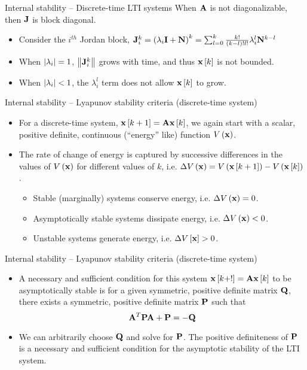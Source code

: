 \documentclass[aspectratio=169]{beamer}
\def\mf{\ensuremath\mathbf}
\def\lp{\ensuremath\left(}
\def\rp{\ensuremath\right)}
\def\lv{\ensuremath\left\lvert}
\def\rv{\ensuremath\right\rvert}
\def\lV{\ensuremath\left\lVert}
\def\rV{\ensuremath\right\rVert}
\def\ls{\ensuremath\left[}
\def\rs{\ensuremath\right]}
\newcommand{\ct}[1]{\lp #1\rp}
\newcommand{\dt}[1]{\ls #1\rs}
\begin{document}
\begin{frame}[t]{Internal stability -- Discrete-time LTI systems}
When $\mf{A}$ is not diagonalizable, then $\mf{J}$ is block diagonal.
\begin{itemize}
    \item Consider the $i^{th}$ Jordan block, $\mf{J}_i^k = \ct{\lambda_i \mf{I} + \mf{N}}^k = \sum_{l=0}^k \frac{k!}{(k - l)!l!}\lambda_i^l\mf{N}^{k - l}$

    \item When $\lv \lambda_i\rv = 1$, $\lV \mf{J}_i^k \rV$ grows with time, and thus $\mf{x}\dt{k}$ is not bounded.

    \item When $\lv \lambda_i\rv < 1$, the $\lambda_i^l$ term does not allow $\mf{x}\dt{k}$ to grow.
\end{itemize}
\end{frame}


\begin{frame}[t]{Internal stability -- Lyapunov stability criteria (discrete-time system)}
\begin{itemize}
    \item For a discrete-time system, $\mf{x}\dt{k + 1} = \mf{A}\mf{x}\dt{k}$, we again start with a scalar, positive definite, continuous (``energy'' like) function $V\ct{\mf{x}}$.

    \item The rate of change of energy is captured by successive differences in the values of $V\ct{\mf{x}}$ for different values of $k$, i.e. $\Delta V\ct{\mf{x}} = V\ct{\mf{x}\dt{k + 1}} - V\ct{\mf{x}\dt{k}}$.
    \begin{itemize}
      \item Stable (marginally) systems conserve energy, i.e. $\Delta V\ct{\mf{x}} = 0$.
      \item Asymptotically stable systems dissipate energy, i.e. $\Delta V\ct{\mf{x}} < 0$.
      \item Unstable systems generate energy, i.e. $\Delta V\dt{\mf{x}} > 0$.
    \end{itemize}
\end{itemize}
\end{frame}


\begin{frame}{Internal stability -- Lyapunov stability criteria (discrete-time system)}
\begin{itemize}
    \item A necessary and sufficient condition for this system $\mf{x}\dt{k+!} = \mf{A}\mf{x}\dt{k}$ to be asymptotically stable is for a given symmetric, positive definite matrix $\mf{Q}$, there exists a symmetric, positive definite matrix $\mf{P}$ such that
    \[ \mf{A}^T\mf{P}\mf{A} + \mf{P} = - \mf{Q} \] 

    \item We can arbitrarily choose $\mf{Q}$ and solve for $\mf{P}$. The positive definiteness of $\mf{P}$ is a necessary and sufficient condition for the asymptotic stability of the LTI system.
\end{itemize}
\end{frame}
\end{document}
